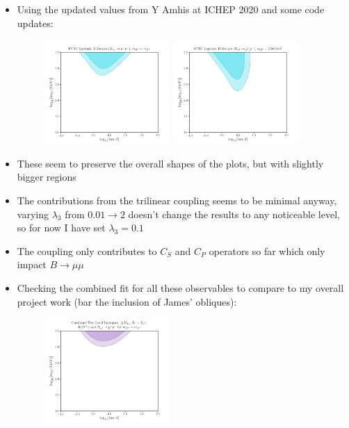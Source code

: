 \documentclass[11pt]{article}
\begin{document}
\begin{itemize}
    \item Using the updated values from Y Amhis at ICHEP 2020 and some code updates:
        \begin{figure}[H]
            \centering
            \includegraphics[width=0.45\textwidth]{bmumu_apx.png}
            \includegraphics[width=0.45\textwidth]{bmumu_fix.png}
        \end{figure}
    \item These seem to preserve the overall shapes of the plots, but with slightly bigger regions
    \item The contributions from the trilinear coupling seems to be minimal anyway, varying $\lambda_3$ from $0.01\to2$ doesn't change the results to any noticeable level, so for now I have set $\lambda_3=0.1$
    \item The coupling only contributes to $C_S$ and $C_P$ operators so far which only impact $B\to\mu\mu$
    \item Checking the combined fit for all these observables to compare to my overall project work (bar the inclusion of James' obliques):
        \begin{figure}[H]
            \centering
            \includegraphics[width=0.45\textwidth]{comb2_apx.png}

\end{figure}
\end{itemize}
\end{document}
